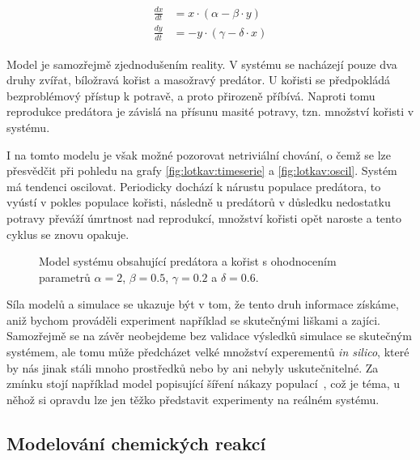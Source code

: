 \begin{align}\label{eq:lotkav}
\begin{array}{ll}
\frac{dx}{dt} &= x\cdot(\alpha - \beta \cdot y)			\\
\frac{dy}{dt} &= -y \cdot (\gamma - \delta \cdot x)
\end{array}
\end{align}

Model je samozřejmě zjednodušením reality. V systému se nacházejí pouze dva druhy
zvířat, bíložravá kořist a masožravý predátor. U kořisti se předpokládá bezproblémový
přístup k potravě, a proto přirozeně příbívá. Naproti tomu reprodukce predátora je
závislá na přísunu masité potravy, tzn. množství kořisti v systému.

I na tomto modelu je však možné pozorovat netriviální chování, o čemž se lze přesvědčit
při pohledu na grafy  \ref{fig:lotkav:timeserie} a \ref{fig:lotkav:oscil}. Systém má
tendenci oscilovat. Periodicky dochází k nárustu populace predátora, to vyústí v pokles
populace kořisti, následně u predátorů v důsledku nedostatku potravy převáží úmrtnost nad reprodukcí,
množství kořisti opět naroste a tento cyklus se znovu opakuje.

\begin{figure}[h!]
\begin{center}
\end{center}
\caption{Model systému obsahující predátora a kořist s ohodnocením parametrů $\alpha = 2$,  $\beta = 0.5$, $\gamma = 0.2$ a $\delta = 0.6$.}
\end{figure}

Síla modelů a simulace se ukazuje být v tom, že tento druh informace získáme, aniž bychom prováděli
experiment například se skutečnými liš\-ka\-mi a zajíci. Samozřejmě se na závěr neobejdeme
bez validace výsledků simulace se skutečným systémem, ale tomu může předcházet velké množství
experementů \textit{in silico}, které by nás jinak stáli mnoho prostředků nebo by ani 
nebyly uskutečnitelné. Za zmínku stojí například model popisující šíření nákazy
populací~\cite{kermack1927}, což je téma, u něhož si opravdu lze jen těžko představit
experimenty na reálném systému.

\subsection{Modelování chemických reakcí}

